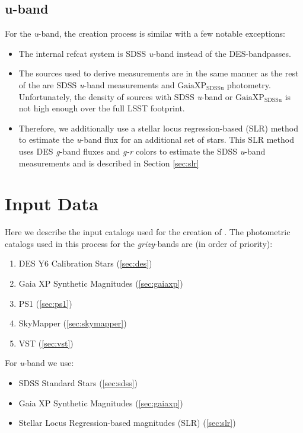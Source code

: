 \subsection{u-band}
For the \textit{u}-band, the creation process is similar with a few notable exceptions:
\begin{itemize}
    \item The internal refcat system is SDSS \textit{u}-band instead of the DES-bandpasses.
    \item The sources used to derive measurements are in the same manner as the rest of the \monster are SDSS \textit{u}-band measurements and $\mathrm{GaiaXP_{SDSSu}}$ photometry. 
    Unfortunately, the density of sources with SDSS \textit{u}-band or $\mathrm{GaiaXP_{SDSSu}}$ is not high enough over the full LSST footprint. 
    \item 
    Therefore, we additionally use a stellar locus regression-based (SLR) method to estimate the \textit{u}-band flux for an additional set of stars. 
    This SLR method uses DES \textit{g}-band fluxes and \textit{g-r} colors to estimate the SDSS \textit{u}-band measurements and is described in Section \ref{sec:slr}
\end{itemize}

\section{Input Data}
\label{sec:input}
Here we describe the input catalogs used for the creation of \monster. 
The photometric catalogs used in this process for the \emph{grizy}-bands are (in order of priority):
\begin{enumerate}
    \item DES Y6 Calibration Stars (\ref{sec:des})
    \item Gaia XP Synthetic Magnitudes (\ref{sec:gaiaxp})
    \item PS1 (\ref{sec:ps1})
    \item SkyMapper (\ref{sec:skymapper})
    \item VST (\ref{sec:vst})
\end{enumerate}

For \textit{u}-band we use:
\begin{itemize}
    \item SDSS Standard Stars (\ref{sec:sdss})
    \item Gaia XP Synthetic Magnitudes (\ref{sec:gaiaxp})
    \item Stellar Locus Regression-based magnitudes (SLR) (\ref{sec:slr})
\end{itemize}

